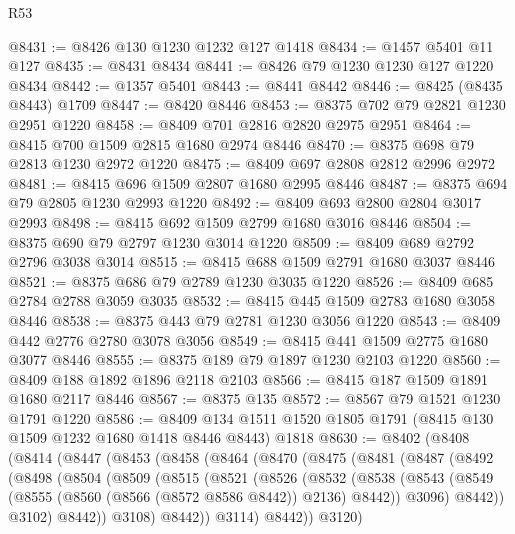 \begin{lexlean}{R53}
\begin{coremodule}
@8431 := @8426 @130 @1230 @1232 @127 @1418
@8434 := @1457 @5401 @11 @127
@8435 := @8431 @8434
@8441 := @8426 @79 @1230 @1230 @127 @1220 @8434
@8442 := @1357 @5401
@8443 := @8441 @8442
@8446 := @8425 (@8435 @8443) @1709
@8447 := @8420 @8446
@8453 := @8375 @702 @79 @2821 @1230 @2951 @1220
@8458 := @8409 @701 @2816 @2820 @2975 @2951
@8464 := @8415 @700 @1509 @2815 @1680 @2974 @8446
@8470 := @8375 @698 @79 @2813 @1230 @2972 @1220
@8475 := @8409 @697 @2808 @2812 @2996 @2972
@8481 := @8415 @696 @1509 @2807 @1680 @2995 @8446
@8487 := @8375 @694 @79 @2805 @1230 @2993 @1220
@8492 := @8409 @693 @2800 @2804 @3017 @2993
@8498 := @8415 @692 @1509 @2799 @1680 @3016 @8446
@8504 := @8375 @690 @79 @2797 @1230 @3014 @1220
@8509 := @8409 @689 @2792 @2796 @3038 @3014
@8515 := @8415 @688 @1509 @2791 @1680 @3037 @8446
@8521 := @8375 @686 @79 @2789 @1230 @3035 @1220
@8526 := @8409 @685 @2784 @2788 @3059 @3035
@8532 := @8415 @445 @1509 @2783 @1680 @3058 @8446
@8538 := @8375 @443 @79 @2781 @1230 @3056 @1220
@8543 := @8409 @442 @2776 @2780 @3078 @3056
@8549 := @8415 @441 @1509 @2775 @1680 @3077 @8446
@8555 := @8375 @189 @79 @1897 @1230 @2103 @1220
@8560 := @8409 @188 @1892 @1896 @2118 @2103
@8566 := @8415 @187 @1509 @1891 @1680 @2117 @8446
@8567 := @8375 @135
@8572 := @8567 @79 @1521 @1230 @1791 @1220
@8586 := @8409 @134 @1511 @1520 @1805 @1791 (@8415 @130 @1509 @1232 @1680 @1418 @8446 @8443) @1818
@8630 := @8402
    (@8408
      (@8414
        (@8447
          (@8453
            (@8458
              (@8464
                (@8470
                  (@8475
                    (@8481
                      (@8487
                        (@8492
                          (@8498
                            (@8504
                              (@8509
                                (@8515
                                  (@8521
                                    (@8526
                                      (@8532
                                        (@8538
                                          (@8543
                                            (@8549
                                              (@8555
                                                (@8560 (@8566 (@8572 @8586 @8442)) @2136)
                                                @8442))
                                            @3096)
                                          @8442))
                                      @3102)
                                    @8442))
                                @3108)
                              @8442))
                          @3114)
                        @8442))
                    @3120)

\end{coremodule}
\end{lexlean}
